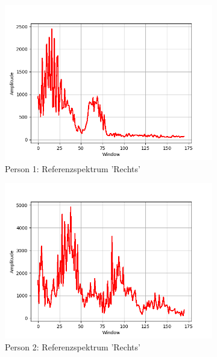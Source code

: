 \documentclass[12pt, oneside, a4paper, \docLanguage]{report}
\begin{document}
\begin{figure}[H]
\centering
	\begin{subfigure}{.5\textwidth}
  		\centering
 		 \includegraphics[width=.95\linewidth]{../data/img/Versuch2/2Averagerechts.png}
  		\caption{Person 1: Referenzspektrum 'Rechts'}
 		 \label{fig:sub1}
	\end{subfigure}%
	\begin{subfigure}{.5\textwidth}
  		\centering
 		 \includegraphics[width=.95\linewidth]{../data/img/Versuch2/Averagerechts.png}
  		\caption{Person 2: Referenzspektrum 'Rechts'}
  		\label{fig:sub2}
	\end{subfigure}
\begin{subfigure}{.5\textwidth}
  		\centering

\end{subfigure}
\end{figure}
\end{document}

